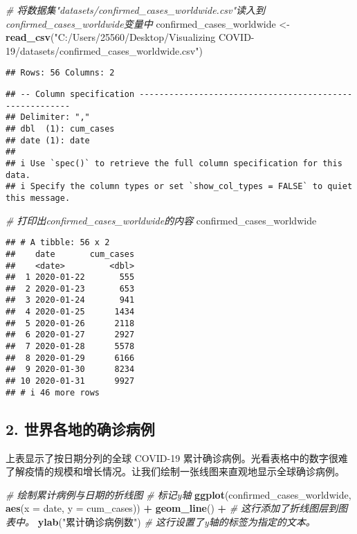 \documentclass[
]{article}
\newenvironment{Shaded}{\begin{snugshade}}{\end{snugshade}}
\newcommand{\AttributeTok}[1]{\textcolor[rgb]{0.13,0.29,0.53}{#1}}
\newcommand{\CommentTok}[1]{\textcolor[rgb]{0.56,0.35,0.01}{\textit{#1}}}
\newcommand{\FunctionTok}[1]{\textcolor[rgb]{0.13,0.29,0.53}{\textbf{#1}}}
\newcommand{\NormalTok}[1]{#1}
\newcommand{\OtherTok}[1]{\textcolor[rgb]{0.56,0.35,0.01}{#1}}
\newcommand{\SpecialCharTok}[1]{\textcolor[rgb]{0.81,0.36,0.00}{\textbf{#1}}}
\newcommand{\StringTok}[1]{\textcolor[rgb]{0.31,0.60,0.02}{#1}}
\begin{document}
\begin{Shaded}
\begin{Highlighting}[]
\CommentTok{\# 将数据集"datasets/confirmed\_cases\_worldwide.csv"读入到confirmed\_cases\_worldwide变量中}
\NormalTok{confirmed\_cases\_worldwide }\OtherTok{\textless{}{-}} \FunctionTok{read\_csv}\NormalTok{(}\StringTok{"C:/Users/25560/Desktop/Visualizing COVID{-}19/datasets/confirmed\_cases\_worldwide.csv"}\NormalTok{)}
\end{Highlighting}
\end{Shaded}

\begin{verbatim}
## Rows: 56 Columns: 2
\end{verbatim}

\begin{verbatim}
## -- Column specification --------------------------------------------------------
## Delimiter: ","
## dbl  (1): cum_cases
## date (1): date
## 
## i Use `spec()` to retrieve the full column specification for this data.
## i Specify the column types or set `show_col_types = FALSE` to quiet this message.
\end{verbatim}

\begin{Shaded}
\begin{Highlighting}[]
\CommentTok{\# 打印出confirmed\_cases\_worldwide的内容}
\NormalTok{confirmed\_cases\_worldwide}
\end{Highlighting}
\end{Shaded}

\begin{verbatim}
## # A tibble: 56 x 2
##    date       cum_cases
##    <date>         <dbl>
##  1 2020-01-22       555
##  2 2020-01-23       653
##  3 2020-01-24       941
##  4 2020-01-25      1434
##  5 2020-01-26      2118
##  6 2020-01-27      2927
##  7 2020-01-28      5578
##  8 2020-01-29      6166
##  9 2020-01-30      8234
## 10 2020-01-31      9927
## # i 46 more rows
\end{verbatim}

\subsection{2.
世界各地的确诊病例}\label{ux4e16ux754cux5404ux5730ux7684ux786eux8bcaux75c5ux4f8b}

上表显示了按日期分列的全球 COVID-19
累计确诊病例。光看表格中的数字很难了解疫情的规模和增长情况。让我们绘制一张线图来直观地显示全球确诊病例。

\begin{Shaded}
\begin{Highlighting}[]
\CommentTok{\# 绘制累计病例与日期的折线图}
\CommentTok{\# 标记y轴}
\FunctionTok{ggplot}\NormalTok{(confirmed\_cases\_worldwide, }\FunctionTok{aes}\NormalTok{(}\AttributeTok{x =}\NormalTok{ date, }\AttributeTok{y =}\NormalTok{ cum\_cases)) }\SpecialCharTok{+}
  \FunctionTok{geom\_line}\NormalTok{() }\SpecialCharTok{+}                       \CommentTok{\# 这行添加了折线图层到图表中。}
  \FunctionTok{ylab}\NormalTok{(}\StringTok{"累计确诊病例数"}\NormalTok{)              }\CommentTok{\# 这行设置了y轴的标签为指定的文本。}
\end{Highlighting}
\end{Shaded}
\end{document}
